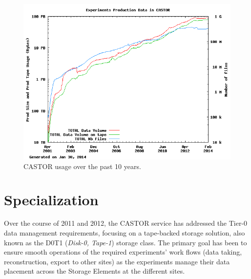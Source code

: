\documentclass[a4paper]{jpconf}
\begin{document}
\begin{figure}[h]
\begin{center}
\includegraphics[width=28pc]{global_statistics.png}
\caption{\label{fig:stats}CASTOR usage over the past 10 years.}
\end{center}
\end{figure}

\section{Specialization}

Over the course of 2011 and 2012, the CASTOR service has addressed the Tier-0 data management requirements, focusing on a tape-backed storage solution, also known as the D0T1 ({\it Disk-0, Tape-1}) storage class. The primary goal has been to ensure smooth operations of the required experiments' work flows (data taking, reconstruction, export to other sites) as the experiments manage their data placement across the Storage Elements at the different sites.
\end{document}

